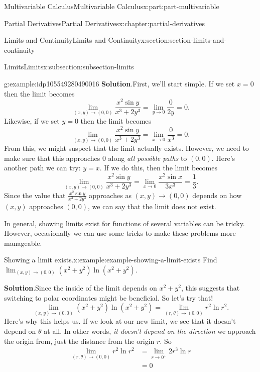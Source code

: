 \documentclass[twoside,10pt,]{book}
\newcommand{\blocktitlefont}{\relax}
\numberwithin{equation}{part}
\begin{document}
\begin{partptx}{Multivariable Calculus}{}{Multivariable Calculus}{}{}{x:part:part-multivariable}
\begin{chapterptx}{Partial Derivatives}{}{Partial Derivatives}{}{}{x:chapter:partial-derivatives}
\begin{sectionptx}{Limits and Continuity}{}{Limits and Continuity}{}{}{x:section:section-limits-and-continuity}
\begin{subsectionptx}{Limits}{}{Limits}{}{}{x:subsection:subsection-limits}
\begin{example}{}{g:example:idp105549280490016}
\noindent\textbf{\blocktitlefont Solution}.\hypertarget{g:solution:idp105549280490912}{}\quad{}First, we'll start simple. If we set \(x = 0\) then the limit becomes%
\begin{equation*}
\lim_{(x,y)\to(0,0)}\frac{x^{2}\sin y}{x^{3}+2y^{3}} = \lim_{y\to0}\frac{0}{2y} = 0.
\end{equation*}
Likewise, if we set \(y=0\) then the limit becomes%
\begin{equation*}
\lim_{(x,y)\to(0,0)}\frac{x^{2}\sin y}{x^{3}+2y^{3}} = \lim_{x\to0}\frac{0}{x^{3}} = 0.
\end{equation*}
From this, we might suspect that the limit actually exists. However, we need to make sure that this approaches \(0\) along \emph{all possible paths} to \((0,0)\). Here's another path we can try: \(y = x\). If we do this, then the limit becomes%
\begin{equation*}
\lim_{(x,y)\to(0,0)}\frac{x^{2}\sin y}{x^{3}+2y^{3}} = \lim_{x\to0}\frac{x^{2}\sin x}{3x^{3}} = \frac{1}{3}.
\end{equation*}
Since the value that \(\frac{x^{2}\sin y}{x^{3}+2y^{3}}\) approaches as \((x,y)\to(0,0)\) depends on how \((x,y)\) approaches \((0,0)\), we can say that the limit does not exist.%
\end{example}
In general, showing limits exist for functions of several variables can be tricky. However, occasionally we can use some tricks to make these problems more manageable.%
\begin{example}{Showing a limit exists.}{x:example:example-showing-a-limit-exists}%
Find \(\lim_{(x,y)\to(0,0)}(x^{2}+y^{2})\ln(x^{2}+y^{2})\).%
\par\smallskip%
\noindent\textbf{\blocktitlefont Solution}.\hypertarget{g:solution:idp105549280497824}{}\quad{}Since the inside of the limit depends on \(x^{2}+y^{2}\), this suggests that switching to polar coordinates might be beneficial. So let's try that!%
\begin{equation*}
\lim_{(x,y)\to(0,0)}(x^{2}+y^{2})\ln(x^{2}+y^{2}) = \lim_{(r,\theta)\to(0,0)}r^{2}\ln r^{2}.
\end{equation*}
Here's why this helps us. If we look at our new limit, we see that it doesn't depend on \(\theta\) at all. In other words, \emph{it doesn't depend on the direction} we approach the origin from, just the distance from the origin \(r\). So%
\begin{align*}
\lim_{(r,\theta)\to(0,0)}r^{2}\ln r^{2} & = \lim_{r\to0^{+}} 2r^{3}\ln r \\
& = 0 
\end{align*}

\end{example}
\end{subsectionptx}
\end{sectionptx}
\end{chapterptx}
\end{partptx}
\end{document}
